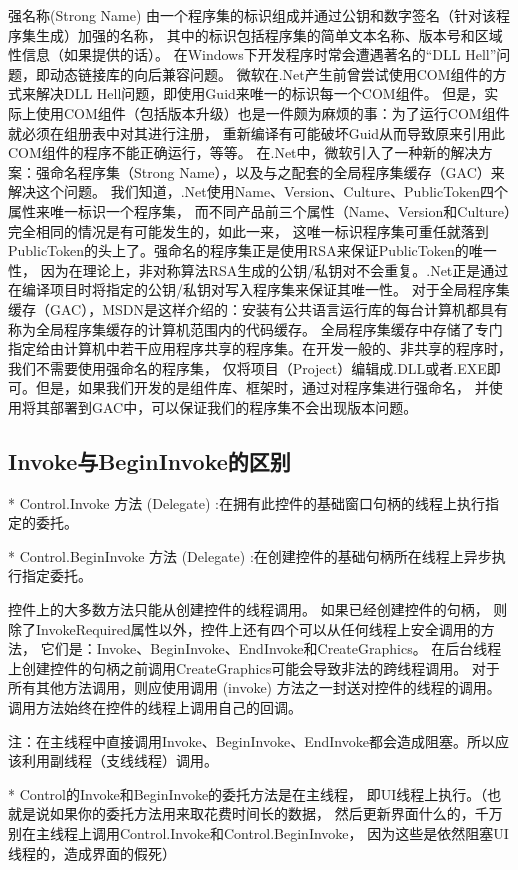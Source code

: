 \documentclass{book}
\begin{document}
强名称(Strong Name) 由一个程序集的标识组成并通过公钥和数字签名（针对该程序集生成）加强的名称，
其中的标识包括程序集的简单文本名称、版本号和区域性信息（如果提供的话）。
在Windows下开发程序时常会遭遇著名的“DLL Hell”问题，即动态链接库的向后兼容问题。
微软在.Net产生前曾尝试使用COM组件的方式来解决DLL Hell问题，即使用Guid来唯一的标识每一个COM组件。
但是，实际上使用COM组件（包括版本升级）也是一件颇为麻烦的事：为了运行COM组件就必须在组册表中对其进行注册，
重新编译有可能破坏Guid从而导致原来引用此COM组件的程序不能正确运行，等等。
在.Net中，微软引入了一种新的解决方案：强命名程序集（Strong Name），以及与之配套的全局程序集缓存（GAC）来解决这个问题。
我们知道，.Net使用Name、Version、Culture、PublicToken四个属性来唯一标识一个程序集，
而不同产品前三个属性（Name、Version和Culture）完全相同的情况是有可能发生的，如此一来，
这唯一标识程序集可重任就落到PublicToken的头上了。强命名的程序集正是使用RSA来保证PublicToken的唯一性，
因为在理论上，非对称算法RSA生成的公钥/私钥对不会重复。.Net正是通过在编译项目时将指定的公钥/私钥对写入程序集来保证其唯一性。
对于全局程序集缓存（GAC），MSDN是这样介绍的：安装有公共语言运行库的每台计算机都具有称为全局程序集缓存的计算机范围内的代码缓存。
全局程序集缓存中存储了专门指定给由计算机中若干应用程序共享的程序集。在开发一般的、非共享的程序时，我们不需要使用强命名的程序集，
仅将项目（Project）编辑成.DLL或者.EXE即可。但是，如果我们开发的是组件库、框架时，通过对程序集进行强命名，
并使用将其部署到GAC中，可以保证我们的程序集不会出现版本问题。

\subsection{Invoke与BeginInvoke的区别}

* Control.Invoke 方法 (Delegate) :在拥有此控件的基础窗口句柄的线程上执行指定的委托。

* Control.BeginInvoke 方法 (Delegate) :在创建控件的基础句柄所在线程上异步执行指定委托。

控件上的大多数方法只能从创建控件的线程调用。 如果已经创建控件的句柄，
则除了InvokeRequired属性以外，控件上还有四个可以从任何线程上安全调用的方法，
它们是：Invoke、BeginInvoke、EndInvoke和CreateGraphics。
在后台线程上创建控件的句柄之前调用CreateGraphics可能会导致非法的跨线程调用。
对于所有其他方法调用，则应使用调用 (invoke) 方法之一封送对控件的线程的调用。
调用方法始终在控件的线程上调用自己的回调。

注：在主线程中直接调用Invoke、BeginInvoke、EndInvoke都会造成阻塞。所以应该利用副线程（支线线程）调用。

* Control的Invoke和BeginInvoke的委托方法是在主线程，
即UI线程上执行。（也就是说如果你的委托方法用来取花费时间长的数据，
然后更新界面什么的，千万别在主线程上调用Control.Invoke和Control.BeginInvoke，
因为这些是依然阻塞UI线程的，造成界面的假死）
\end{document}
